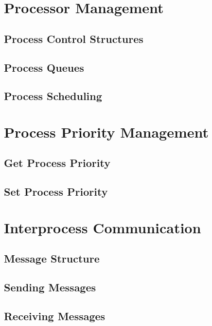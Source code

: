\documentclass[12pt]{report}
\begin{document}
\section{Processor Management}

\subsection{Process Control Structures}


\subsection{Process Queues}


\subsection{Process Scheduling}



\section{Process Priority Management}

\subsection{Get Process Priority}


\subsection{Set Process Priority}



\section{Interprocess Communication}

\subsection{Message Structure}


\subsection{Sending Messages}


\subsection{Receiving Messages}
\end{document}
